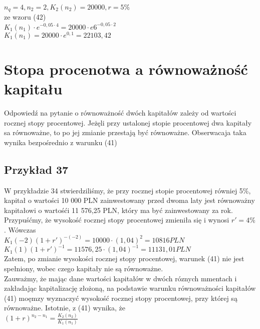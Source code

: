 \documentclass{article}
\begin{document}
$ n_q = 4, n_2 = 2, K_2(n_2) = 20 000, r = 5\%  $\\

ze wzoru (42)\\

$ K_1(n_1) \cdot e ^{-0,05\cdot 4} = 20 000 \cdot e6^{-0,05 \cdot 2} $\\

$ K_1(n_1)  = 20 000 \cdot e ^{0,1} = 22 103, 42 $

\newpage

\section{Stopa procenotwa a równoważność kapitału}

Odpowiedź na pytanie o równoważność dwóch kapitałów zależy od wartości rocznej stopy procentowej. Jeżęli przy ustalonej stopie procentowej dwa kapitały sa równoważne, to po jej zmianie przestają być równoważne. Obserwacaja taka wynika bezpośrednio z warunku (41)

\subsection{Przykład 37}

W przykładzie 34 stwierdziliśmy, że przy rocznej stopie procentowej równiej 5\%, kapitał o wartości 10 000 PLN zainwestowany przed dwoma laty jest równoważny kapitałowi o wartośći 11 576,25 PLN, który ma być zainwestowany za rok. Przypuśćmy, że wysokość rocznej stopy procentowej zmieniła się i wynosi $ r' = 4\% $. Wówczas\\

$ K_1(-2)(1+r')^{-(-2)} = 10 000 \cdot (1,04)^2 = 10 816 PLN $\\

$ K_1(1)(1+r')^{-1} = 11 576,25 \cdot (1,04)^{-1} = 11 131,01 PLN $\\

Zatem, po zmianie wysokości rocznej stopy procentowej, warunek (41) nie jest spełniony, wobec czego kapitały nie są równoważne.\\

Zauważmy, że mając dane wartości kapitałów w dwóch róznych mmentach i zakładając kapitalizację złożoną, na podstawie warunku równoważności kapitałów (41) moęmzy wyznaczyć wysokość rocznej stopy procentowej, przy której są równoważne. Istotnie, z (41) wynika, że\\

$ (1 + r)^{n_2 - n_1} = \frac{K_2(n_2)}{K_1(n_1)} $\\
\end{document}
